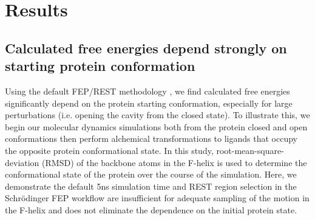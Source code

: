 \documentclass[journal=jctcce,manuscript=article]{achemso}
\begin{document}
\section{Results}
\subsection*{Calculated free energies depend strongly on starting protein conformation}
Using the default FEP/REST methodology \cite{FEP/REST}, we find calculated free energies significantly depend on the protein starting conformation, especially for large perturbations (i.e. opening the cavity from the closed state).
To illustrate this, we begin our molecular dynamics simulations both from the protein closed and open conformations then perform alchemical transformations to ligands that occupy the opposite protein conformational state.
In this study, root-mean-square-deviation (RMSD) of the backbone atoms in the F-helix is used to determine the conformational state of the protein over the course of the simulation.
Here, we demonstrate the default 5ns simulation time and REST region selection in the Schr\"{o}dinger FEP workflow are insufficient for adequate sampling of the motion in the F-helix and does not eliminate the dependence on the initial protein state.
\end{document}
